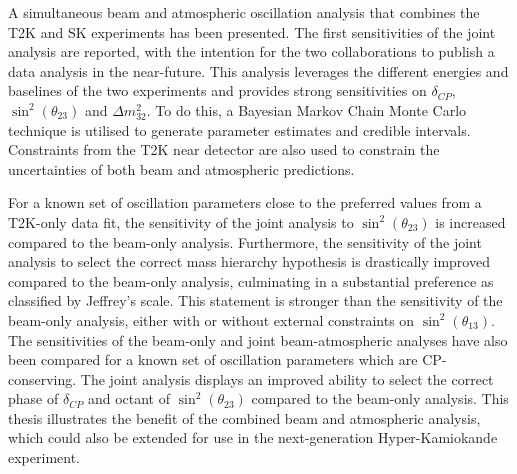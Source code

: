 
A simultaneous beam and atmospheric oscillation analysis that combines the T2K and SK experiments has been presented. The first sensitivities of the joint analysis are reported, with the intention for the two collaborations to publish a data analysis in the near-future. This analysis leverages the different energies and baselines of the two experiments and provides strong sensitivities on $\delta_{CP}$, $\sin^{2}(\theta_{23})$ and $\Delta m^{2}_{32}$. To do this, a Bayesian Markov Chain Monte Carlo technique is utilised to generate parameter estimates and credible intervals. Constraints from the T2K near detector are also used to constrain the uncertainties of both beam and atmospheric predictions.

For a known set of oscillation parameters close to the preferred values from a T2K-only data fit, the sensitivity of the joint analysis to $\sin^{2}(\theta_{23})$ is increased compared to the beam-only analysis. Furthermore, the sensitivity of the joint analysis to select the correct mass hierarchy hypothesis is drastically improved compared to the beam-only analysis, culminating in a substantial preference as classified by Jeffrey's scale. This statement is stronger than the sensitivity of the beam-only analysis, either with or without external constraints on $\sin^{2}(\theta_{13})$. The sensitivities of the beam-only and joint beam-atmospheric analyses have also been compared for a known set of oscillation parameters which are CP-conserving. The joint analysis displays an improved ability to select the correct phase of $\delta_{CP}$ and octant of $\sin^{2}(\theta_{23})$ compared to the beam-only analysis. This thesis illustrates the benefit of the combined beam and atmospheric analysis, which could also be extended for use in the next-generation Hyper-Kamiokande experiment.
